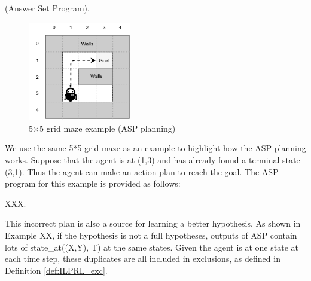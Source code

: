 \begin{examp} \normalfont (Answer Set Program).

\begin{figure}[!htb]
\centering
\includegraphics[width=0.4\textwidth]{./figures/asp_example}
\caption{5$\times$5 grid maze example (ASP planning)}
\label{environment_example}
\end{figure}
We use the same 5*5 grid maze as an example to highlight how the ASP planning works. 
Suppose that the agent is at (1,3) and has already found a terminal state (3,1).
Thus the agent can make an action plan to reach the goal. The ASP program for this example is provided as follows:



\end{examp}
    

XXX.

This incorrect plan is also a source for learning a better hypothesis. 
As shown in Example XX, if the hypothesis is not a full hypotheses, outputs of ASP contain lots of \textsf{state\_at((X,Y), T)} at the same states. 
Given the agent is at one state at each time step, these duplicates are all included in exclusions, as defined in Definition \ref{def:ILPRL_exc}.

